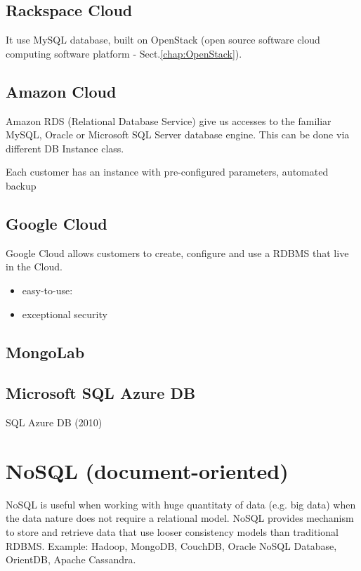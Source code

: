 \subsection{Rackspace Cloud}

It use MySQL database, built on OpenStack (open source software cloud computing
software platform - Sect.\ref{chap:OpenStack}).

\subsection{Amazon Cloud}

Amazon RDS (Relational Database Service) give us accesses to the familiar MySQL,
Oracle or Microsoft SQL Server database engine. This can be done via different
DB Instance class.


Each customer has an instance with pre-configured parameters, automated backup

\subsection{Google Cloud}

Google Cloud allows customers to create, configure and use a RDBMS that live in
the Cloud.
\begin{itemize}
  \item easy-to-use:
  \item exceptional security
\end{itemize}


\subsection{MongoLab}



\subsection{Microsoft SQL Azure DB}

SQL Azure DB (2010)



\section{NoSQL (document-oriented)}
\label{sec:NoSQL}
\label{sec:NoSQL_document-oriented}

NoSQL is useful when working with huge quantitaty of data (e.g. big data) when
the data nature does not require a relational model. NoSQL provides mechanism to
store and retrieve data that use looser consistency models than traditional
RDBMS. Example: Hadoop, MongoDB, CouchDB, Oracle NoSQL Database, OrientDB,
Apache Cassandra.

